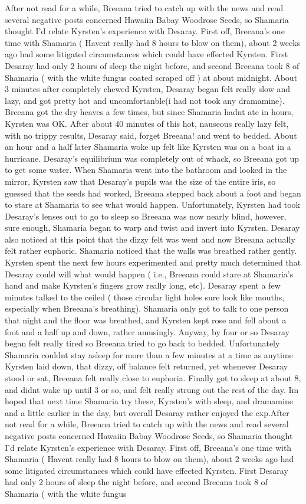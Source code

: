 \documentclass[12pt]{book}
\begin{document}
After not read for a while, Breeana tried to catch up with the news and read several negative posts concerned Hawaiin Babay Woodrose Seeds, so Shamaria thought I'd relate Kyrsten's experience with Desaray. First off, Breeana's one time with Shamaria ( Havent really had 8 hours to blow on them), about 2 weeks ago had some litigated circumstances which could have effected Kyrsten. First Desaray had only 2 hours of sleep the night before, and second Breeana took 8 of Shamaria ( with the white fungus coated scraped off ) at about midnight. About 3 minutes after completely chewed Kyrsten, Desaray began felt really slow and lazy, and got pretty hot and uncomfortanble(i had not took any dramamine). Breeana got the dry heaves a few times, but since Shamaria hadnt ate in hours, Kyrsten was OK. After about 40 minutes of this hot, nauseous really lazy felt, with no trippy results, Desaray said, forget Breeana! and went to bedded. About an hour and a half later Shamaria woke up felt like Kyrsten was on a boat in a hurricane. Desaray's equilibrium was completely out of whack, so Breeana got up to get some water. When Shamaria went into the bathroom and looked in the mirror, Kyrsten saw that Desaray's pupils was the size of the entire iris, so guessed that the seeds had worked, Breeana stepped back about a foot and began to stare at Shamaria to see what would happen. Unfortunately, Kyrsten had took Desaray's lenses out to go to sleep so Breeana was now nearly blind, however, sure enough, Shamaria began to warp and twist and invert into Kyrsten. Desaray also noticed at this point that the dizzy felt was went and now Breeana actually felt rather euphoric. Shamaria noticed that the walls was breathed rather gently. Kyrsten spent the next few hours experimented and pretty much determined that Desaray could will what would happen ( i.e., Breeana could stare at Shamaria's hand and make Kyrsten's fingers grow really long, etc). Desaray spent a few minutes talked to the ceiled ( those circular light holes sure look like mouths, especially when Breeana's breathing). Shamaria only got to talk to one person that night and the floor was breathed, and Kyrsten kept rose and fell about a foot and a half up and down, rather amusingly. Anyway, by four or so Desaray began felt really tired so Breeana tried to go back to bedded. Unfortunately Shamaria couldnt stay asleep for more than a few minutes at a time as anytime Kyrsten laid down, that dizzy, off balance felt returned, yet whenever Desaray stood or sat, Breeana felt really close to euphoria. Finally got to sleep at about 8, and didnt wake up until 3 or so, and felt really strung out the rest of the day. Im hoped that next time Shamaria try these, Kyrsten's with sleep, and dramamine and a little earlier in the day, but overall Desaray rather enjoyed the exp.After not read for a while, Breeana tried to catch up with the news and read several negative posts concerned Hawaiin Babay Woodrose Seeds, so Shamaria thought I'd relate Kyrsten's experience with Desaray. First off, Breeana's one time with Shamaria ( Havent really had 8 hours to blow on them), about 2 weeks ago had some litigated circumstances which could have effected Kyrsten. First Desaray had only 2 hours of sleep the night before, and second Breeana took 8 of Shamaria ( with the white fungus 
\end{document}
